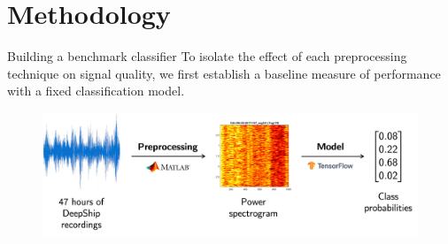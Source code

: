\documentclass[]{beamer}
\begin{document}

\section{Methodology}

\begin{frame}{Building a benchmark classifier}
    To isolate the effect of each preprocessing technique on signal quality, we first establish a baseline measure of performance with a fixed classification model.
    \vspace{0.25cm}
    \begin{figure}
        \centering
        \includegraphics[width=\linewidth]{img/methodology_flowchart_2.png}
    \end{figure}
\end{frame}
\end{document}
